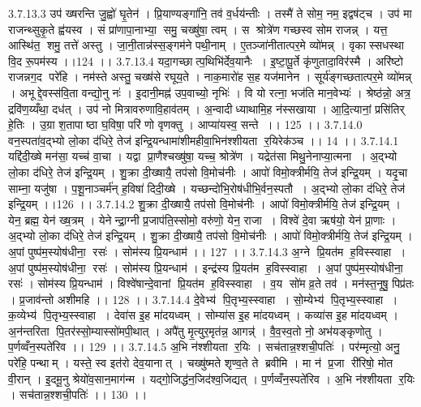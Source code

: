 3.7.13.3
उप॑ ख्षरन्ति जु॒ह्वो॑ घृ॒तेन॑ । प्रि॒याण्यङ्गा॑नि॒ तव॑ व॒र्धय॑न्तीः । तस्मै॑ ते सोम॒ नम॒ इद्वष॑ट्च । उप॑ मा राजन्थ्सुकृ॒ते ह्व॑यस्व । सं प्रा॑णापा॒नाभ्या॒॒ समु॒ चख्षु॑षा॒ त्वम् । स श्रोत्रे॑ण गच्छस्व सोम राजन्न् । यत्त॒ आस्थि॑त॒॒ शमु॒ तत्ते॑ अस्तु । जा॒नी॒तान्न॑स्स॒ङ्गम॑ने पथी॒नाम् । ए॒तञ्जा॑नीतात्पर॒मे व्यो॑मन्न् । वृकास्सधस्था वि॒द रू॒पम॑स्य ।।124 ।।
3.7.13.4
यदा॒गच्छात्प॒थिभि॑र्देव॒यानैः । इ॒ष्टा॒पू॒र्ते कृ॑णुतादा॒विर॑स्मै । अरि॑ष्टो राजन्नग॒द परे॑हि । नम॑स्ते अस्तु॒ चख्ष॑से रघूय॒ते । नाक॒मारो॑ह स॒ह यज॑मानेन । सूर्य॑ङ्गच्छतात्पर॒मे व्यो॑मन्न् । अभूद्दे॒वस्स॑वि॒ता वन्द्यो॒नु नः॑ । इ॒दानी॒मह्न॑ उप॒वाच्यो॒ नृभिः॑ । वि यो रत्ना॒ भज॑ति मान॒वेभ्यः॑ । श्रेष्ठ॑न्नो॒ अत्र॒ द्रवि॑ण॒य्यँथा॒ दध॑त् । उप॑ नो मित्रावरुणावि॒हाव॑तम् । अ॒न्वादीध्याथामि॒ह न॑स्सखाया । आ॒दि॒त्यानां॒ प्रसि॑तिर् हे॒तिः । उ॒ग्रा श॒तापाष्ठा घ॒विषा॒ परि॑ णो वृणक्तु । आप्या॑यस्व॒ सन्ते ।। 125 ।।
3.7.14.0
वन॒स्पता॑व॒द्भ्यो लो॒का द॑धिरे॒ तेज॑ इन्द्रि॒यन्धामा॑शीमहीवा॒भिन॑श्शीयता र॒यिरेक॑ञ्च ।। 14 ।।
3.7.14.1
यद्दि॑दी॒ख्षे मन॑सा॒ यच्च॑ वा॒चा । यद्वा प्रा॒णैश्चख्षु॑षा॒ यच्च॒ श्रोत्रे॑ण । यद्रेत॑सा मिथु॒नेनाप्या॒त्मना । अ॒द्भ्यो लो॒का द॑धिरे॒ तेज॑ इन्द्रि॒यम् । शु॒क्रा दी॒ख्षायै॒ तप॑सो वि॒मोच॑नीः । आपो॑ विमो॒क्त्रीर्मयि॒ तेज॑ इन्द्रि॒यम् । यदृ॒चा साम्ना॒ यजु॑षा । प॒शू॒नाञ्चर्म॑न् ह॒विषा॑ दिदी॒ख्षे । यच्छन्दो॑भि॒रोष॑धीभि॒र्वन॒स्पतौ । अ॒द्भ्यो लो॒का द॑धिरे॒ तेज॑ इन्द्रि॒यम् ।।126 ।।
3.7.14.2
शु॒क्रा दी॒ख्षायै॒ तप॑सो वि॒मोच॑नीः । आपो॑ विमो॒क्त्रीर्मयि॒ तेज॑ इन्द्रि॒यम् । येन॒ ब्रह्म॒ येन॑ ख्ष॒त्रम् । येनेन्द्रा॒ग्नी प्र॒जाप॑ति॒स्सोमो॒ वरु॑णो॒ येन॒ राजा । विश्वे॑ दे॒वा ऋष॑यो॒ येन॑ प्रा॒णाः । अ॒द्भ्यो लो॒का द॑धिरे॒ तेज॑ इन्द्रि॒यम् । शु॒क्रा दी॒ख्षायै॒ तप॑सो वि॒मोच॑नीः । आपो॑ विमो॒क्त्रीर्मयि॒ तेज॑ इन्द्रि॒यम् । अ॒पां पुष्प॑म॒स्योष॑धीना॒॒ रसः॑ । सोम॑स्य प्रि॒यन्धाम॑ ।। 127 ।।
3.7.14.3
अ॒ग्ने प्रि॒यत॑म ह॒विस्स्वाहा । अ॒पां पुष्प॑म॒स्योष॑धीना॒॒ रसः॑ । सोम॑स्य प्रि॒यन्धाम॑ । इन्द्र॑स्य प्रि॒यत॑म ह॒विस्स्वाहा । अ॒पां पुष्प॑म॒स्योष॑धीना॒॒ रसः॑ । सोम॑स्य प्रि॒यन्धाम॑ । विश्वे॑षान्दे॒वानां प्रि॒यत॑म ह॒विस्स्वाहा । व॒य सो॑म व्र॒ते तव॑ । मन॑स्त॒नूषु॒ पिप्र॑तः । प्र॒जाव॑न्तो अशीमहि ।। 128 ।।
3.7.14.4
दे॒वेभ्य॑ पि॒तृभ्य॒स्स्वाहा । सो॒म्येभ्य॑ पि॒तृभ्य॒स्स्वाहा । क॒व्येभ्य॑ पि॒तृभ्य॒स्स्वाहा । देवा॑स इ॒ह मा॑दयध्वम् । सोम्या॑स इ॒ह मा॑दयध्वम् । कव्या॑स इ॒ह मा॑दयध्वम् । अ॒न॑न्तरिता पि॒तर॑स्सो॒म्यास्सो॑मपी॒थात् । अपै॑तु मृ॒त्युर॒मृत॑न्न॒ आगन्न्॑ । वै॒व॒स्व॒तो नो॒ अभ॑यङ्कृणोतु । प॒र्णव्वँन॒स्पते॑रिव ।। 129 ।।
3.7.14.5
अ॒भि न॑श्शीयता र॒यिः । सच॑तान्न॒श्शची॒पतिः॑ । पर॑म्मृत्यो॒ अनु॒ परे॑हि॒ पन्थाम् । यस्ते॒ स्व इत॑रो देव॒यानात् । चख्षु॑ष्मते शृण्व॒ते ते ब्रवीमि । मा न॑ प्र॒जा री॑रिषो॒ मोत वी॒रान् । इ॒दमू॒नु श्रेयो॑व॒सान॒माग॑न्म । यद्गो॒जिद्ध॑न॒जिद॑श्व॒जिद्यत् । प॒र्णव्वँन॒स्पते॑रिव । अ॒भि न॑श्शीयता र॒यिः । सच॑तान्न॒श्शची॒पतिः॑ ।। 130 ।।
